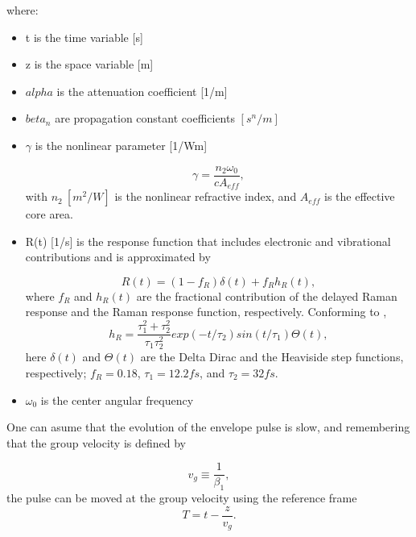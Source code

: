     where: 
    \begin{itemize}
        \item t is the time variable [s]
        \item z is the space variable [m]
        \item $alpha$ is the attenuation coefficient [1/m]
        \item $beta_n$ are propagation constant coefficients $[s^n/m]$
        \item $\gamma$ is the nonlinear parameter [1/Wm]
        
            \begin{equation}
                \gamma = \frac{n_2 \omega_0}{c A_{eff}},
                \label{eq_gamma}
            \end{equation}
        with $n_2 \ [m^2/W]$ is the nonlinear refractive index, and $A_{eff}$  is the  effective core area.
        \item R(t) [1/s] is the response function that includes electronic and vibrational contributions and is approximated by 
        
        \begin{equation}\label{eq_rt}
            R(t) = (1- f_R)\delta(t) + f_R h_R(t),
        \end{equation}
        where $f_R$ and $h_R(t)$ are the fractional contribution of the delayed Raman response and the Raman response function, respectively. Conforming to \cite{dudley_taylor_2010}, 
        \begin{equation}\label{eq_hr}
            h_R = \frac{\tau^2_1+\tau^2_2}{\tau_1\tau^2_2} exp(-t/\tau_2)sin(t/\tau_1)\Theta(t),
        \end{equation}
        here $\delta(t)$ and $\Theta(t)$ are the Delta Dirac and the Heaviside step functions, respectively; $f_R = 0.18$,  $\tau_1 =12.2 fs$, and $\tau_2 = 32 fs$.
         
         
        \item $\omega_0$  is the center angular frequency
    
    \end{itemize}
   
    One can asume that the evolution of the envelope pulse is slow, and remembering that the group velocity is defined by 
    
    \begin{equation}\label{eq_vg}
        v_g \equiv \frac{1}{\beta_1}, 
    \end{equation}
    the pulse can be moved at the group velocity using the reference frame 
    \begin{equation}\label{eq_t}
        T = t - \frac{z}{v_g}. 
    \end{equation}
    
